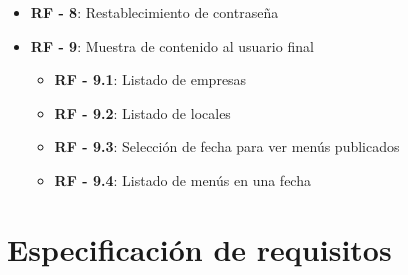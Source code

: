 \begin{itemize}
	\item \textbf{RF - 8}: Restablecimiento de contraseña
	\item \textbf{RF - 9}: Muestra de contenido al usuario final
	\begin{itemize}
		\item \textbf{RF - 9.1}: Listado de empresas
		\item \textbf{RF - 9.2}: Listado de locales
		\item \textbf{RF - 9.3}: Selección de fecha para ver menús publicados
		\item \textbf{RF - 9.4}: Listado de menús en una fecha
	\end{itemize}
\end{itemize}


\section{Especificación de requisitos}



